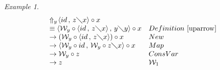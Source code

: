 \documentclass[11pt]{amsart}
\theoremstyle{plain}
\theoremstyle{definition}
\theoremstyle{remark}
\newtheorem{example}[theorem]{Example}
\numberwithin{equation}{section}
\newcommand{\ci}{\circ}
\newcommand{\mi}{\,,\,}
\newcommand{\is}{\diagdown}
\newcommand{\arrow}{\rightarrow}
\newcommand{\la}{\langle}
\newcommand{\ra}{\rangle}
\renewcommand{\pi}{\mathcal{W}}
\begin{document}
\begin{example}\label{4.28}
$$\begin{array}{ll}
\Uparrow_y\!\la id\mi z\is x\ra\ci x & \\
\equiv\la\pi_y\ci\la id\mi z\is x\ra\mi y\is y\ra\ci x &
Definition~\ref{uparrow}\\
\arrow(\pi_y\ci\la id\mi z\is x\ra)\ci x & New\\
\arrow\la\pi_y\ci id\mi\pi_y\ci z\is x\ra\ci x & Map\\
\arrow\pi_y\ci z & ConsVar\\
\arrow z & \pi_1
\end{array}$$
\end{example}

\newpage



\end{document}
